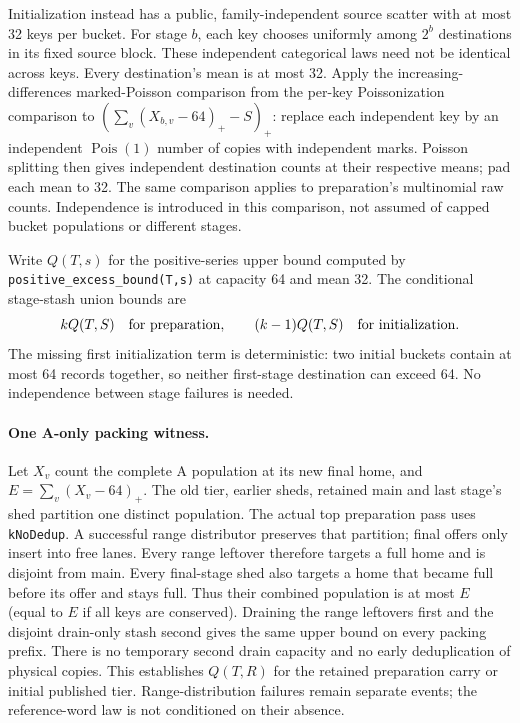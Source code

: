 \documentclass[11pt]{article}
\theoremstyle{definition}
\theoremstyle{remark}
\newcommand{\Pois}{\operatorname{Pois}}
\begin{document}
Initialization instead has a public, family-independent source scatter
with at most 32 keys per bucket. For stage $b$, each key chooses uniformly
among $2^b$ destinations in its fixed source block. These independent
categorical laws need not be identical across keys. Every destination's
mean is at most 32. Apply the increasing-differences marked-Poisson
comparison from the per-key Poissonization comparison to
$(\sum_v(X_{b,v}-64)_+-S)_+$: replace each independent key by an independent
$\Pois(1)$ number of copies with independent marks. Poisson splitting
then gives independent destination counts at their respective means;
pad each mean to 32. The same comparison applies to preparation's
multinomial raw counts. Independence is introduced in this comparison,
not assumed of capped bucket populations or different stages.

Write $Q(T,s)$ for the positive-series upper bound computed by
\texttt{positive\_excess\_bound(T,s)} at capacity 64 and mean 32.
The conditional stage-stash union bounds are
\[
 kQ(T,S)\quad\hbox{for preparation},\qquad
 (k-1)Q(T,S)\quad\hbox{for initialization}.
\]
The missing first initialization term is deterministic: two initial buckets
contain at most 64 records together, so neither first-stage destination
can exceed 64. No independence between stage failures is needed.

\paragraph{One A-only packing witness.}
Let $X_v$ count the complete A population at its new final home, and
$E=\sum_v(X_v-64)_+$. The old tier, earlier sheds, retained main and last
stage's shed partition one distinct population. The actual top preparation
pass uses \texttt{kNoDedup}. A successful range distributor preserves that
partition; final offers only insert into free lanes. Every range leftover
therefore targets a full home and is disjoint from main. Every final-stage
shed also targets a home that became full before its offer and stays full.
Thus their combined population is at most $E$ (equal to $E$ if all keys
are conserved). Draining the range leftovers first and the disjoint
drain-only stash second gives the same upper bound on every packing prefix.
There is no temporary second drain capacity and no early deduplication of
physical copies. This establishes $Q(T,R)$ for the retained preparation
carry or initial published tier. Range-distribution failures remain separate
events; the reference-word law is not conditioned on their absence.
\end{document}
